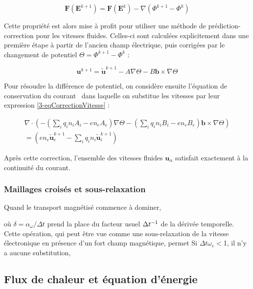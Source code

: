 \begin{refsection}
\begin{equation}
\label{3-eqCorrection}
\mathbf F(\mathbf E^{k+1}) = \mathbf F(\mathbf E^{k})-\nabla
(\Phi^{k+1}-\Phi^{k})
\end{equation}

Cette propriété est alors mise à profit pour utiliser une méthode de
prédiction-correction pour les vitesses fluides. Celles-ci sont calculées
explicitement dans une première étape à partir de l'ancien champ électrique,
puis corrigées par le changement de potentiel $\Theta=\Phi^{k+1}-\Phi^k$ :

\begin{equation}
\label{3-eqCorrectionVitesse}
\mathbf u^{k+1} = \tilde{\mathbf u}^{k+1}-A\nabla
\Theta-B\mathbf b\times\nabla
\Theta
\end{equation}

Pour résoudre la différence de potentiel, on considère ensuite l'équation de
conservation du courant~ dans laquelle on substitue les
vitesses par leur expression \eqref{3-eqCorrectionVitesse} :

\begin{equation}
\begin{split}
\label{3-eqCourantCoefficient}
\nabla\cdot(-(\sum_iq_in_iA_i-en_eA_e)\nabla
\Theta-(\sum_iq_in_iB_i-en_eB_e)\mathbf
b\times\nabla
\Theta)\\=(en_e\tilde{\mathbf
u}_e^{k+1}-\sum_iq_in_i\tilde{\mathbf u}_i^{k+1})
\end{split}
\end{equation}

Après cette correction, l'ensemble des vitesses fluides $\mathbf u_\alpha$
satisfait exactement à la continuité du courant. 

\subsubsection{Maillages croisés et sous-relaxation}

Quand le transport magnétisé commence à dominer, 


où $\delta=\alpha_\omega/\Delta t$ prend la place du facteur
usuel $\Delta t^{{-1}}$ de la dérivée temporelle. Cette opération, qui
peut être vue comme une sous-relaxation de la vitesse électronique en présence
d'un fort champ magnétique, permet  Si $\Delta t\omega_c<$1, il n'y a aucune
substitution,


\subsection{Flux de chaleur et équation d'énergie}


\end{refsection}
